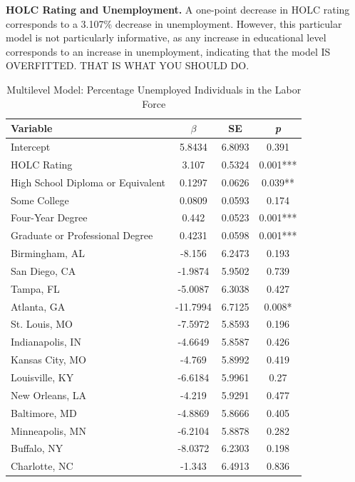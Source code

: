 \documentclass[paper=letter, fontsize=12pt]{scrartcl} %
\begin{document}
\begin{table}
	\textbf{HOLC Rating and Unemployment.} A one-point decrease in HOLC rating corresponds to a 3.107\% decrease in unemployment. However, this particular model is not particularly informative, as any increase in educational level corresponds to an increase in unemployment, indicating that the model IS OVERFITTED. THAT IS WHAT YOU SHOULD DO.
	\caption{Multilevel Model: Percentage Unemployed Individuals in the Labor Force}
	\begin{center}
		\begin{tabular}{|| l | c c c ||}
			\hline
			Variable & $\beta$ & SE & \textit{p}\\
			\hline \hline
			Intercept & 5.8434 & 6.8093 & 0.391\\ 
			\hline 
			HOLC Rating & 3.107 & 0.5324 & 0.001***\\ 
			\hline 
			High School Diploma or Equivalent & 0.1297 & 0.0626 & 0.039**\\ 
			\hline 
			Some College &0.0809 & 0.0593 & 0.174\\ 
			\hline 
			Four-Year Degree &0.442 & 0.0523 & 0.001***\\ 
			\hline 
			Graduate or Professional Degree &0.4231 & 0.0598 & 0.001***\\ 
			\hline 
			Birmingham, AL & -8.156 & 6.2473 & 0.193\\ 
			\hline 
			San Diego, CA & -1.9874 & 5.9502 & 0.739\\ 
			\hline 
			Tampa, FL & -5.0087 & 6.3038 & 0.427\\ 
			\hline 
			Atlanta, GA & -11.7994 & 6.7125 & 0.008*\\ 
			\hline 
			St. Louis, MO & -7.5972 & 5.8593 & 0.196\\ 
			\hline 
			Indianapolis, IN & -4.6649 & 5.8587 & 0.426\\ 
			\hline 
			Kansas City, MO & -4.769 & 5.8992 & 0.419\\ 
			\hline 
			Louisville, KY & -6.6184 & 5.9961 & 0.27\\ 
			\hline 
			New Orleans, LA & -4.219 & 5.9291 & 0.477\\ 
			\hline 
			Baltimore, MD & -4.8869 & 5.8666 & 0.405\\ 
			\hline 
			Minneapolis, MN & -6.2104 & 5.8878 & 0.282\\ 
			\hline 
			Buffalo, NY & -8.0372 & 6.2303 & 0.198\\ 
			\hline 
			Charlotte, NC & -1.343 & 6.4913 & 0.836\\ 

\end{tabular}
\end{center}
\end{table}
\end{document}
